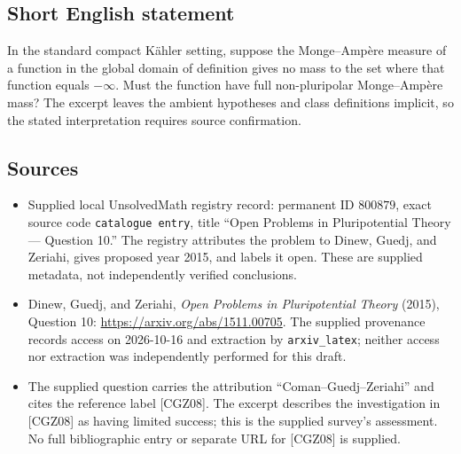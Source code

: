 \documentclass[11pt]{article}
\begin{document}
\subsection{Short English statement}
In the standard compact Kähler setting, suppose the Monge--Ampère measure of a function in the global domain of definition gives no mass to the set where that function equals \(-\infty\). Must the function have full non-pluripolar Monge--Ampère mass? The excerpt leaves the ambient hypotheses and class definitions implicit, so the stated interpretation requires source confirmation.
\subsection{Sources}
\begin{itemize}
\item Supplied local UnsolvedMath registry record: permanent ID \(800879\), exact source code \texttt{catalogue entry}, title ``Open Problems in Pluripotential Theory --- Question 10.'' The registry attributes the problem to Dinew, Guedj, and Zeriahi, gives proposed year 2015, and labels it open. These are supplied metadata, not independently verified conclusions.
\item Dinew, Guedj, and Zeriahi, \emph{Open Problems in Pluripotential Theory} (2015), Question 10: \url{https://arxiv.org/abs/1511.00705}. The supplied provenance records access on 2026-10-16 and extraction by \texttt{arxiv\_latex}; neither access nor extraction was independently performed for this draft.
\item The supplied question carries the attribution ``Coman--Guedj--Zeriahi'' and cites the reference label [CGZ08]. The excerpt describes the investigation in [CGZ08] as having limited success; this is the supplied survey's assessment. No full bibliographic entry or separate URL for [CGZ08] is supplied.
\end{itemize}
\end{document}
